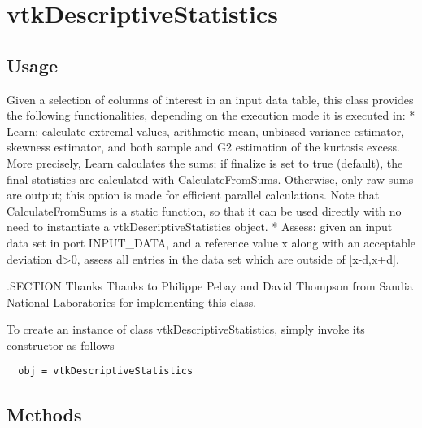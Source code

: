\section{vtkDescriptiveStatistics}

\subsection{Usage}

 Given a selection of columns of interest in an input data table, this 
 class provides the following functionalities, depending on the
 execution mode it is executed in:
 * Learn: calculate extremal values, arithmetic mean, unbiased variance 
   estimator, skewness estimator, and both sample and G2 estimation of the 
   kurtosis excess. More precisely, Learn calculates the sums; if
    finalize is set to true (default), the final statistics are calculated
   with CalculateFromSums. Otherwise, only raw sums are output; this 
   option is made for efficient parallel calculations.
   Note that CalculateFromSums is a static function, so that it can be used
   directly with no need to instantiate a vtkDescriptiveStatistics object.
 * Assess: given an input data set in port INPUT\_DATA, and a reference value x along
   with an acceptable deviation d>0, assess all entries in the data set which
   are outside of [x-d,x+d].

 .SECTION Thanks
 Thanks to Philippe Pebay and David Thompson from Sandia National Laboratories 
 for implementing this class.

To create an instance of class vtkDescriptiveStatistics, simply
invoke its constructor as follows
\begin{verbatim}
  obj = vtkDescriptiveStatistics
\end{verbatim}
\subsection{Methods}


